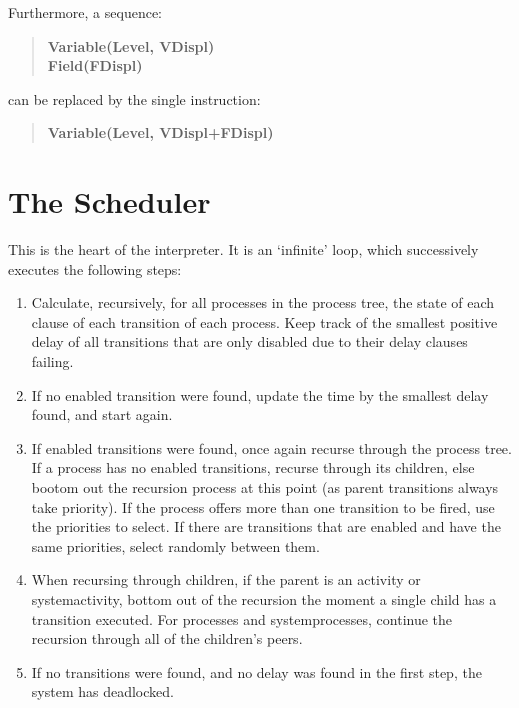 Furthermore, a sequence:
\begin{verse}
{\bf Variable(Level, VDispl)}\\
{\bf Field(FDispl)}
\end{verse}
can be replaced by the single instruction:
\begin{verse}
{\bf Variable(Level, VDispl+FDispl)}
\end{verse}

\section{The Scheduler}

This is the heart of the interpreter. It is an `infinite' loop, which
successively executes the following steps:
\begin{enumerate}
\item{Calculate, recursively, for all processes in the process tree,
the state of each clause of each transition of each process. Keep
track of the smallest positive delay of all transitions that are only
disabled due to their delay clauses failing.}
\item{If no enabled transition were found, update the time by the
smallest delay found, and start again.}
\item{If enabled transitions were found, once again recurse through
the process tree. If a process has no enabled transitions, recurse
through its children, else bootom out the recursion process at this
point (as parent transitions always take priority). If the process
offers more than one transition to be fired, use the priorities to
select. If there are transitions that are enabled and have the same
priorities, select randomly between them.}
\item{When recursing through children, if the parent is an activity
or systemactivity, bottom out of the recursion the moment a single
child has a transition executed. For processes and systemprocesses,
continue the recursion through all of the children's peers.}
\item{If no transitions were found, and no delay was found in the
first step, the system has deadlocked.}
\end{enumerate}

